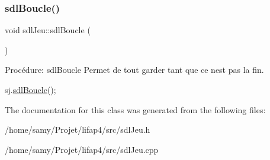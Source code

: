 \subsubsection{\texorpdfstring{sdl\+Boucle()}{sdlBoucle()}}
{\footnotesize\ttfamily void sdl\+Jeu\+::sdl\+Boucle (\begin{DoxyParamCaption}{ }\end{DoxyParamCaption})}



Procédure\+: sdl\+Boucle Permet de tout garder tant que ce n\textquotesingle{}est pas la fin. 


\begin{DoxyCode}
sj.\hyperlink{classsdlJeu_a5628835d7efcab056985c3aa3de56836}{sdlBoucle}();
\end{DoxyCode}
 

The documentation for this class was generated from the following files\+:\begin{DoxyCompactItemize}
\item 
/home/samy/\+Projet/lifap4/src/sdl\+Jeu.\+h\item 
/home/samy/\+Projet/lifap4/src/sdl\+Jeu.\+cpp\end{DoxyCompactItemize}
